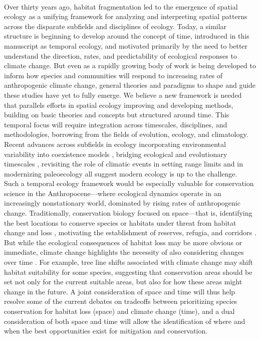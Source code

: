 \documentclass[11pt,a4paper,oneside]{article}
\begin{document}
\\

Over thirty years ago, habitat fragmentation led to the emergence of spatial ecology as a unifying framework for analyzing and interpreting spatial patterns across the disparate subfields and disciplines of ecology. Today, a similar structure is beginning to develop around the concept of time, introduced in this manuscript as temporal ecology, and motivated primarily by the need to better understand the direction, rates, and predictability of ecological responses to climate change. But even as a rapidly growing body of work is being developed to inform how species and communities will respond to increasing rates of anthropogenic climate change, general theories and paradigms to shape and guide these studies have yet to fully emerge. We believe a new framework is needed that parallels efforts in spatial ecology improving and developing methods, building on basic theories and concepts but structured around time. This temporal focus will require integration across timescales, disciplines, and methodologies, borrowing from the fields of evolution, ecology, and climatology. Recent advances across subfields in ecology incorporating environmental variability into coexistence models \citep{Chesson:1997dz}, bridging ecological and evolutionary timescales \citep{schoener2011}, revisiting the role of climatic events in setting range limits \citep{Tran2007} and in modernizing paleoecology \citep{Brewer2012} all suggest modern ecology is up to the challenge.\\ %

Such a temporal ecology framework would be especially valuable for conservation science in the Anthropocene---where ecological dynamics operate in an increasingly nonstationary world, dominated by rising rates of anthropogenic change. Traditionally, conservation biology focused on space---that is, identifying the best locations to conserve species or habitats under threat from habitat change and loss \citep[e.g.,][]{Doak:1989oc,Cincotta:2000gk}, motivating the establishment of reserves, refugia, and corridors \citep[e.g.,][]{Doak:1989oc}. But while the ecological consequences of habitat loss may be more obvious or immediate, climate change highlights the necessity of also considering changes over time \citep[e.g.,][]{Laurance2012}. For example, tree line shifts associated with climate change may shift habitat suitability for some species, suggesting that conservation areas should be set not only for the current suitable areas, but also for how these areas might change in the future. A joint consideration of space and time will thus help resolve some of the current debates on tradeoffs between prioritizing species conservation for habitat loss (space) and climate change (time), and a dual consideration of both space and time will allow the identification of where and when the best opportunities exist for mitigation and conservation.\\
\end{document}
